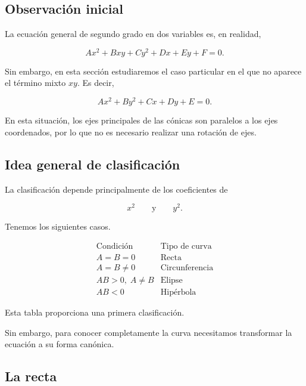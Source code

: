 \documentclass[12pt]{article}
\begin{document}
\subsection*{Observación inicial}

La ecuación general de segundo grado en dos variables es, en realidad,

\[
Ax^2+Bxy+Cy^2+Dx+Ey+F=0.
\]

Sin embargo, en esta sección estudiaremos el caso particular en el que no
aparece el término mixto \(xy\). Es decir,

\[
\boxed{
Ax^2+By^2+Cx+Dy+E=0
}.
\]

En esta situación, los ejes principales de las cónicas son paralelos a
los ejes coordenados, por lo que no es necesario realizar una rotación
de ejes.

\subsection*{Idea general de clasificación}

La clasificación depende principalmente de los coeficientes de

\[
x^2
\qquad\text{y}\qquad
y^2.
\]

Tenemos los siguientes casos.

\[
\boxed{
\begin{array}{c|c}
\text{Condición} & \text{Tipo de curva}\\
\hline
A=B=0 & \text{Recta}\\
A=B\neq0 & \text{Circunferencia}\\
AB>0,\;A\neq B & \text{Elipse}\\
AB<0 & \text{Hipérbola}
\end{array}
}
\]

Esta tabla proporciona una primera clasificación.

Sin embargo, para conocer completamente la curva necesitamos transformar
la ecuación a su forma canónica.

\subsection{La recta}
\end{document}
